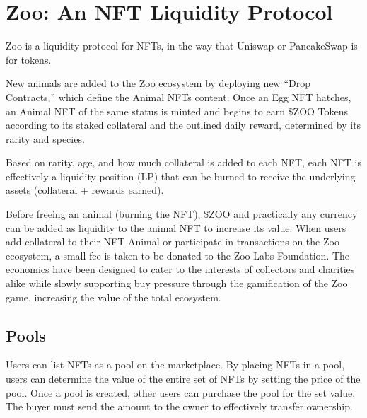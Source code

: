 \section{Zoo: An NFT Liquidity Protocol}

Zoo is a liquidity protocol for NFTs, in the way that Uniswap or PancakeSwap is for tokens.

New animals are added to the Zoo ecosystem by deploying new ``Drop Contracts,'' which define the Animal NFTs content. Once an Egg NFT hatches, an Animal NFT of the same status is minted and begins to earn \$ZOO Tokens according to its staked collateral and the outlined daily reward, determined by its rarity and species.

Based on rarity, age, and how much collateral is added to each NFT, each NFT is effectively a liquidity position (LP) that can be burned to receive the underlying assets (collateral + rewards earned).

Before freeing an animal (burning the NFT), \$ZOO and practically any currency can be added as liquidity to the animal NFT to increase its value. When users add collateral to their NFT Animal or participate in transactions on the Zoo ecosystem, a small fee is taken to be donated to the Zoo Labs Foundation. The economics have been designed to cater to the interests of collectors and charities alike while slowly supporting buy pressure through the gamification of the Zoo game, increasing the value of the total ecosystem.

\subsection{Pools}

Users can list NFTs as a pool on the marketplace. By placing NFTs in a pool, users can determine the value of the entire set of NFTs by setting the price of the pool. Once a pool is created, other users can purchase the pool for the set value. The buyer must send the amount to the owner to effectively transfer ownership.
